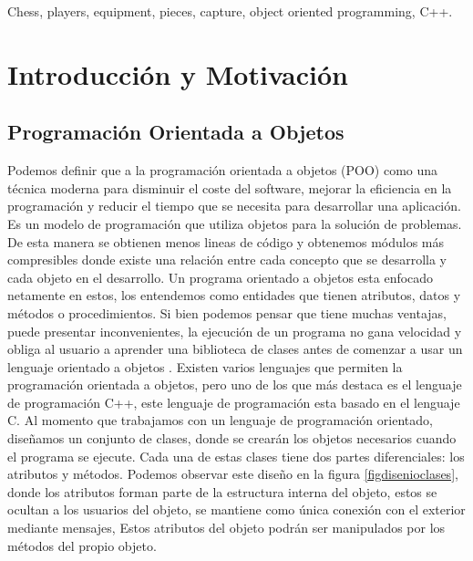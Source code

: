 \documentclass[conference]{IEEEtran}
\newcommand\tab[1][1cm]{\hspace*{#1}}
\begin{document}
\renewcommand{\IEEEkeywordsname}{Keywords}
\begin{IEEEkeywords}
Chess, players, equipment, pieces, capture, object oriented programming, C++.
\end{IEEEkeywords}

\section{Introducción y Motivación}

    \subsection{Programación Orientada a Objetos}

    Podemos definir que a la programación orientada a objetos (POO) como una técnica moderna para disminuir el coste del software, mejorar la eficiencia en la programación y reducir el tiempo que se necesita para desarrollar una aplicación. Es un modelo de programación que utiliza objetos para la solución de problemas. De esta manera se obtienen menos lineas de código y obtenemos módulos más compresibles donde existe una relación entre cada concepto que se desarrolla y cada objeto en el desarrollo. Un programa orientado a objetos esta enfocado netamente en estos, los entendemos como entidades que tienen atributos, datos y métodos o procedimientos. Si bien podemos pensar que tiene muchas ventajas, puede presentar inconvenientes, la ejecución de un programa no gana velocidad y obliga al usuario a aprender una biblioteca de clases antes de comenzar a usar un lenguaje orientado a objetos \citep{sierra2007programacion}.
    \newline
    \newline
    \tab[0.55cm] Existen varios lenguajes que permiten la programación orientada a objetos, pero uno de los que más destaca es el lenguaje de programación C++, este lenguaje de programación esta basado en el lenguaje C. Al momento que trabajamos con un lenguaje de programación orientado, diseñamos un conjunto de clases, donde se crearán los objetos necesarios cuando el programa se ejecute. Cada una de estas clases tiene dos partes diferenciales: los atributos y métodos. 
    \newline
    \newline
    \tab[0.55cm] Podemos observar este diseño en la figura \ref{figdisenioclases}, donde los atributos forman parte de la estructura interna del objeto, estos se ocultan a los usuarios del objeto, se mantiene como única conexión con el exterior mediante mensajes, Estos atributos del objeto podrán ser manipulados por los métodos del propio objeto.
\end{document}
